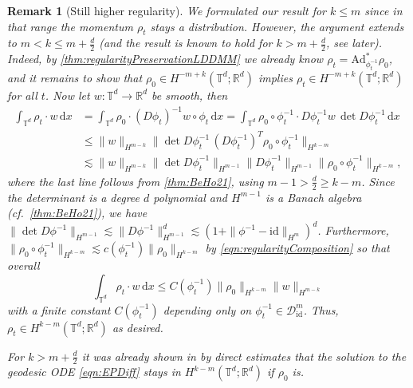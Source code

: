 \documentclass[a4paper, 12pt]{article}
\newtheorem{remark}[theorem]{Remark}
\newcommand{\R}{\mathbb{R}}
\newcommand{\T}{\mathbb{T}}
\renewcommand{\d}{\mathrm{d}}
\newcommand{\id}{\mathrm{id}}
\newcommand{\DiffSobId}{\mathcal D_{\id}}
\newcommand{\adjointMap}{\mathrm{Ad}}
\begin{document}
\begin{remark}[Still higher regularity]\label{rem:higherRegularity}
We formulated our result for $k\leq m$ since in that range the momentum $\rho_t$ stays a distribution.
However, the argument extends to $m<k\leq m+\frac d2$
(and the result is known to hold for $k>m+\frac d2$, see later).
Indeed, by \cref{thm:regularityPreservationLDDMM} we already know $\rho_t=\adjointMap_{\phi_t^{-1}}^*\rho_0$,
and it remains to show that $\rho_0\in H^{-m+k}(\T^d;\R^d)$ implies $\rho_t\in H^{-m+k}(\T^d;\R^d)$ for all $t$.
Now let $w:\T^d\to\R^d$ be smooth, then
\begin{align*}
\int_{\T^d}\rho_t\cdot w\,\d x
&=\int_{\T^d}\rho_0\cdot(D\phi_t)^{-1}w\circ\phi_t\,\d x
=\int_{\T^d}\rho_0\circ\phi_t^{-1}\cdot D\phi_t^{-1}w\,\det D\phi_t^{-1}\,\d x\\
&\leq\|w\|_{H^{m-k}}\|\det D\phi_t^{-1}\,(D\phi_t^{-1})^T\rho_0\circ\phi_t^{-1}\|_{H^{k-m}}\\
&\lesssim\|w\|_{H^{m-k}}\|\det D\phi_t^{-1}\|_{H^{m-1}}\|D\phi_t^{-1}\|_{H^{m-1}}\|\rho_0\circ\phi_t^{-1}\|_{H^{k-m}},
\end{align*}
where the last line follows from \cref{thm:BeHo21}, using $m-1>\frac d2\geq k-m$.
Since the determinant is a degree $d$ polynomial and $H^{m-1}$ is a Banach algebra (cf.\ \cref{thm:BeHo21}),
we have $\|\det D\phi^{-1}\|_{H^{m-1}}\lesssim\|D\phi^{-1}\|_{H^{m-1}}^d\lesssim(1+\|\phi^{-1}-\id\|_{H^m})^d$.
Furthermore, $\|\rho_0\circ\phi_t^{-1}\|_{H^{k-m}}\lesssim c(\phi_t^{-1})\|\rho_0\|_{H^{k-m}}$ by \eqref{eqn:regularityComposition}
so that overall
\begin{equation*}
\int_{\T^d}\rho_t\cdot w\,\d x
\leq C(\phi_t^{-1})\|\rho_0\|_{H^{k-m}}\|w\|_{H^{m-k}}
\end{equation*}
with a finite constant $C(\phi_t^{-1})$ depending only on $\phi_t^{-1}\in\DiffSobId^m$.
Thus, $\rho_t\in H^{k-m}(\T^d;\R^d)$ as desired.

For $k>m+\frac d2$ it was already shown in \cite[Thm.\,4.1]{MiPr10} by direct estimates
that the solution to the geodesic ODE \eqref{eqn:EPDiff} stays in $H^{k-m}(\T^d;\R^d)$ if $\rho_0$ is.
\end{remark}
\end{document}
